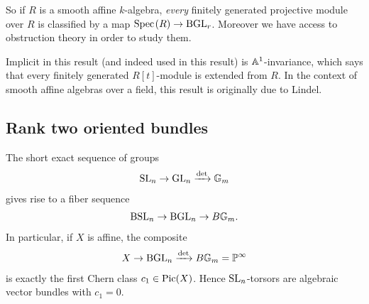 \documentclass[11pt,openany]{book}
\begin{document}
So if $R$ is a smooth affine $k$-algebra, \textit{every} finitely generated projective module over $R$ is classified by a map $\text{Spec}\hspace{0.1em}(R) \to \mathrm{BGL}_r$. Moreover we have access to obstruction theory in order to study them.

Implicit in this result (and indeed used in this result) is $\mathbb{A}^1$-invariance, which says that every finitely generated $R[t]$-module is extended from $R$. In the context of smooth affine algebras over a field, this result is originally due to Lindel.

\subsection{Rank two oriented bundles}

The short exact sequence of groups
\begin{align*}
    \mathrm{SL}_n \to \mathrm{GL}_n \xrightarrow{\det} \mathbb{G}_m
\end{align*}
gives rise to a fiber sequence
\begin{align*}
    \mathrm{BSL}_n \to \mathrm{BGL}_n \to B \mathbb{G}_m.
\end{align*}
In particular, if $X$ is affine, the composite
\begin{align*}
    X \to \mathrm{BGL}_n \xrightarrow{\det} B \mathbb{G}_m = \mathbb{P}^\infty
\end{align*}
is exactly the first Chern class $c_1 \in \mathrm{Pic}(X)$. Hence $\mathrm{SL}_n$-torsors are algebraic vector bundles with $c_1 = 0$.
\end{document}
